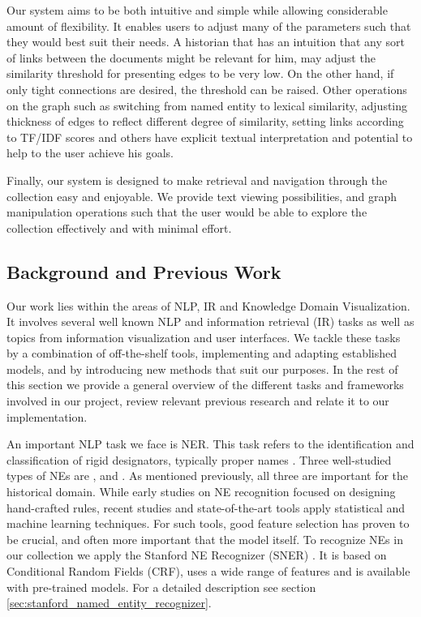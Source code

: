 Our system aims to be both intuitive and simple while allowing considerable amount of flexibility. It enables users to adjust many of the 
parameters such that they would best suit their needs. A historian that has an intuition that any sort of links between the documents might 
be relevant for him, may adjust the similarity threshold for presenting edges to be very low. On the other hand, if only tight connections 
are desired, the threshold can be raised. Other operations on the graph such as switching from named entity to lexical similarity, adjusting 
thickness of edges to reflect different degree of similarity, setting links according to TF/IDF scores and others have explicit textual 
interpretation and potential to help to the user achieve his goals. 

Finally, our system is designed to make retrieval and navigation through the collection easy and enjoyable. We provide text viewing 
possibilities, and graph manipulation operations such that the user would be able to explore the collection effectively and with minimal effort.


\subsection {Background and Previous Work}
\label{sec:nlp_background}


Our work lies within the areas of NLP, IR and Knowledge Domain Visualization.
It involves several well known NLP and information retrieval (IR) tasks as well as topics from information visualization and user interfaces. 
We tackle these tasks by a combination of off-the-shelf tools, implementing and adapting established models, and by introducing new methods 
that suit our purposes.  In the rest of this section we provide a general overview of the different tasks and frameworks involved in our 
project, review relevant previous research and relate it to our implementation. 

An important NLP task we face is NER. This task refers to the identification and classification of rigid designators, 
typically proper names \cite{NEsurvey2009}. Three well-studied types of NEs are ,  and . 
As mentioned previously, all three are important for the historical domain. While early studies on NE recognition focused on designing 
hand-crafted rules, recent studies and state-of-the-art tools apply statistical and machine learning techniques. For such tools, 
good feature selection has proven to be crucial, and often more important that the model itself.  
To recognize NEs in our collection we apply the Stanford NE Recognizer (SNER) \cite{sner}. It is based on Conditional Random Fields (CRF), 
uses a wide range of features and is available with pre-trained models.  For a detailed description see section \ref{sec:stanford_named_entity_recognizer}.


